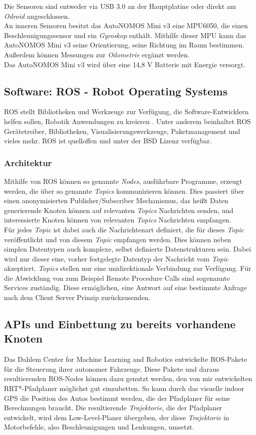 Die Sensoren sind entweder via USB 3.0 an der Hauptplatine oder direkt am \textit{Odroid} angeschlossen. \\
An inneren Sensoren besitzt das AutoNOMOS Mini v3 eine MPU6050, die einen Beschleunigungssensor und ein \textit{Gyroskop} enthält. Mithilfe dieser MPU kann das AutoNOMOS Mini v3 seine Orientierung, seine Richtung im Raum bestimmen. Außerdem können Messungen zur \textit{Odometrie} ergänzt werden.\\
Das AutoNOMOS Mini v3 wird über eine 14,8 V Batterie mit Energie versorgt.

\subsection{Software: ROS - Robot Operating Systems}
ROS stellt Bibliotheken und Werkzeuge zur Verfügung, die Software-Entwicklern helfen sollen, Robotik Anwendungen zu kreieren \citep{ROS}. Unter anderem beinhaltet ROS Gerätetreiber, Bibliotheken, Visualisierungswerkzeuge, Paketmanagement und vieles mehr. ROS ist quelloffen und unter der BSD Lizenz verfügbar.
\subsubsection{Architektur}
Mithilfe von ROS können so genannte \textit{Nodes}, ausführbare Programme, erzeugt werden, die über so genannte \textit{Topics} kommunizieren können. Dies passiert über einen anonymisierten Publisher/Subscriber Mechanismus, das heißt Daten generierende Knoten können auf relevanten \textit{Topics} Nachrichten senden, und interessierte Knoten können von relevanten \textit{Topics} Nachrichten empfangen. \\
Für jedes \textit{Topic} ist dabei auch die Nachrichtenart definiert, die für dieses \textit{Topic} veröffentlicht und von diesem \textit{Topic} empfangen werden. Dies können neben simplen Datentypen auch komplexe, selbst definierte Datenstrukturen sein. Dabei wird nur dieser eine, vorher festgelegte Datentyp der Nachricht vom \textit{Topic} akzeptiert.
\textit{Topics} stellen nur eine unidirektionale Verbindung zur Verfügung. Für die Abwicklung von zum Beispiel Remote Procedure Calls sind sogenannte Services zuständig. Diese ermöglichen, eine Antwort auf eine bestimmte Anfrage nach dem Client Server Prinzip zurückzusenden.
\subsection{APIs und Einbettung zu bereits vorhandene Knoten}
Das Dahlem Center for Machine Learning and Robotics entwickelte ROS-Pakete für die Steuerung ihrer autonomer Fahrzeuge. Diese Pakete und daraus resultierenden ROS-Nodes können dazu genutzt werden, den von mir entwickelten RRT*-Pfadplaner möglichst gut einzubetten. So kann durch das visuelle indoor GPS die Position des Autos bestimmt werden, die der Pfadplaner für seine Berechnungen braucht. Die resultierende \textit{Trajektorie}, die der Pfadplaner entwickelt, wird dem Low-Level-Planer übergeben, der diese \textit{Trajektorie} in Motorbefehle, also Beschleunigungen und Lenkungen, umsetzt. 
